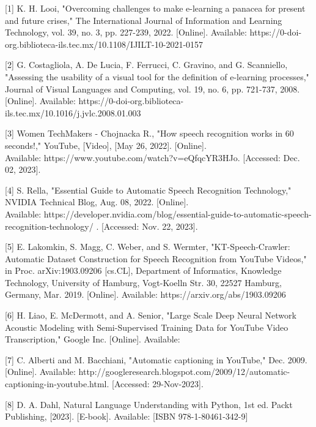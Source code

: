


[1]  K. H. Looi, "Overcoming challenges to make e-learning a panacea for present and future crises," The International Journal of Information and Learning Technology, vol. 39, no. 3, pp. 227-239, 2022. [Online]. Available: https://0-doi-org.biblioteca-ils.tec.mx/10.1108/IJILT-10-2021-0157



[2] G. Costagliola, A. De Lucia, F. Ferrucci, C. Gravino, and G. Scanniello, "Assessing the usability of a visual tool for the definition of e-learning processes," Journal of Visual Languages and Computing, vol. 19, no. 6, pp. 721-737, 2008. [Online]. Available: https://0-doi-org.biblioteca-ils.tec.mx/10.1016/j.jvlc.2008.01.003


[3] Women TechMakers - Chojnacka R., "How speech recognition works in 60 seconds!," YouTube, [Video], [May 26, 2022]. [Online]. \\
 Available: https://www.youtube.com/watch?v=eQfqcYR3HJo. [Accessed: Dec. 02, 2023].



[4] S. Rella, "Essential Guide to Automatic Speech Recognition Technology," NVIDIA Technical Blog, Aug. 08, 2022. [Online]. \\
Available: https://developer.nvidia.com/blog/essential-guide-to-automatic-speech-recognition-technology/ . [Accessed: Nov. 22, 2023].



[5]  E. Lakomkin, S. Magg, C. Weber, and S. Wermter, "KT-Speech-Crawler: Automatic Dataset Construction for Speech Recognition from YouTube Videos," in Proc. arXiv:1903.09206 [cs.CL], Department of Informatics, Knowledge Technology, University of Hamburg, Vogt-Koelln Str. 30, 22527 Hamburg, Germany, Mar. 2019. [Online]. Available: https://arxiv.org/abs/1903.09206

[6]  H. Liao, E. McDermott, and A. Senior, "Large Scale Deep Neural Network Acoustic Modeling with Semi-Supervised Training Data for YouTube Video Transcription," Google Inc. [Online]. Available: 

[7] C. Alberti and M. Bacchiani, "Automatic captioning in YouTube," Dec. 2009. [Online]. Available: http://googleresearch.blogspot.com/2009/12/automatic-captioning-in-youtube.html. [Accessed: 29-Nov-2023].







[8] D. A. Dahl, Natural Language Understanding with Python, 1st ed. Packt Publishing, [2023]. [E-book]. Available: [ISBN 978-1-80461-342-9]


